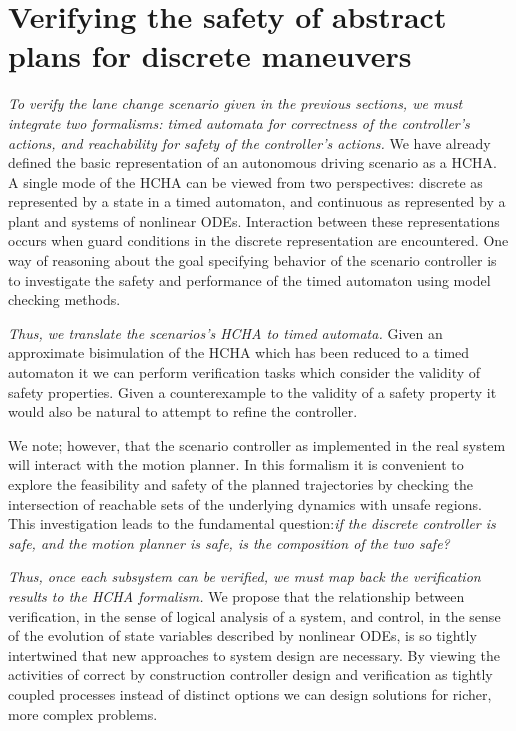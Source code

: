 \section{Verifying the safety of abstract plans for discrete maneuvers}
\label{verifyingSafety}

{\it To verify the lane change scenario given in the previous sections, we must integrate two formalisms: timed automata for correctness of the controller's actions, and reachability for safety of the controller's actions.} We have already defined the basic representation of an autonomous driving scenario as a HCHA. A single mode of the HCHA can be viewed from two perspectives: discrete as represented by a state in a timed automaton, and continuous as represented by a plant and systems of nonlinear ODEs. Interaction between these representations occurs when guard conditions in the discrete representation are encountered. One way of reasoning about the goal specifying behavior of the scenario controller is to investigate the safety and performance of the timed automaton using model checking methods.

{\it Thus, we translate the scenarios's HCHA to timed automata.} Given an approximate bisimulation of the HCHA which has been reduced to a timed automaton it we can perform verification tasks which consider the validity of safety properties. Given a counterexample to the validity of a safety property it would also be natural to attempt to refine the controller. 

We note; however, that the scenario controller as implemented in the real system will interact with the motion planner. In this formalism it is convenient to explore the feasibility and safety of the planned trajectories by checking the intersection of reachable sets of the underlying dynamics with unsafe regions. This investigation leads to the fundamental question:{\it if the discrete controller is safe, and the motion planner is safe, is the composition of the two safe?}

{\it Thus, once each subsystem can be verified, we must map back the verification results to the HCHA formalism.}
We propose that the relationship between verification, in the sense of logical analysis of a system, and control, in the sense of the evolution of state variables described by nonlinear ODEs, is so tightly intertwined that new approaches to system design are necessary. By viewing the activities of correct by construction controller design and verification as tightly coupled processes instead of distinct options we can design solutions for richer, more complex problems.

